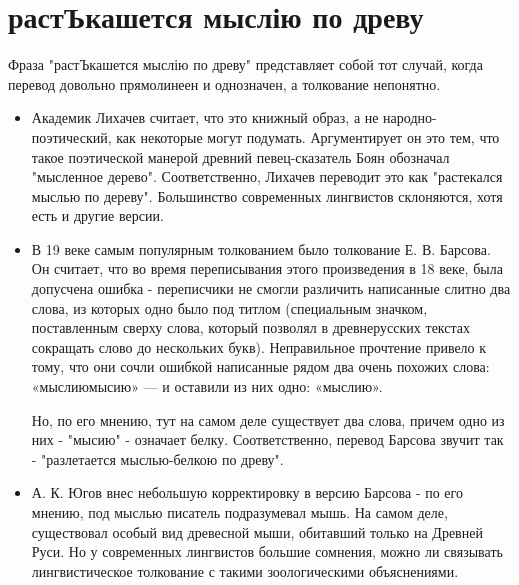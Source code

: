 \documentclass[14pt, a4paper]{article}
\begin{document}
\section{растЪкашется мыслію по древу}
\par Фраза "растЪкашется мыслію по древу" представляет собой тот случай, когда перевод довольно прямолинеен и однозначен, а толкование непонятно.
\begin{itemize}
  \item Академик Лихачев считает, что это книжный образ, а не народно-поэтический, как некоторые могут подумать. Аргументирует он это тем, что такое поэтической манерой древний певец-сказатель Боян обозначал "мысленное дерево". Соответственно, Лихачев переводит это как "растекался мыслью по дереву". Большинство современных лингвистов склоняются, хотя есть и другие версии.
  \item В 19 веке самым популярным толкованием было толкование Е. В. Барсова. Он считает, что во время переписывания этого произведения в 18 веке, была допусчена ошибка - переписчики не смогли различить написанные слитно два слова, из которых одно было под титлом (специальным значком, поставленным сверху слова, который позво­лял в древнерусских текстах сокращать слово до нескольких букв). Неправильное прочтение привело к тому, что они сочли ошибкой написанные рядом два очень похожих слова: «мыслиюмысию» — и оставили из них одно: «мыслию».
  \par Но, по его мнению, тут на самом деле существует два слова, причем одно из них - "мысию" - означает белку. Соответственно, перевод Барсова звучит так - "разлетается мыслью-белкою по древу".
  \item А. К. Югов внес небольшую корректировку в версию Барсова - по его мнению, под мыслью писатель подразумевал мышь. На самом деле, существовал особый вид древесной мыши, обитавший только на Древней Руси. Но у современных лингвистов большие сомнения, можно ли связывать лингвистическое толкование с такими зоологическими объяснениями.
\end{itemize}
\end{document}
